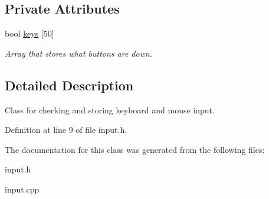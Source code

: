 \subsection*{Private Attributes}
\begin{DoxyCompactItemize}
\item 
bool \hyperlink{classInput_abb6decf78aac69a63afc06677b1fbdba}{keys} \mbox{[}50\mbox{]}\hypertarget{classInput_abb6decf78aac69a63afc06677b1fbdba}{}\label{classInput_abb6decf78aac69a63afc06677b1fbdba}

\begin{DoxyCompactList}\small\item\em Array that stores what buttons are down. \end{DoxyCompactList}\end{DoxyCompactItemize}


\subsection{Detailed Description}
Class for checking and storing keyboard and mouse input. 

Definition at line 9 of file input.\+h.



The documentation for this class was generated from the following files\+:\begin{DoxyCompactItemize}
\item 
input.\+h\item 
input.\+cpp\end{DoxyCompactItemize}
